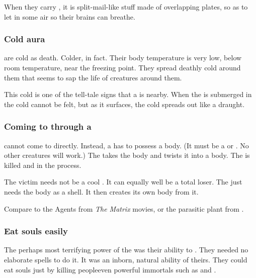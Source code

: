 When they carry \armour, it is split-mail-like stuff made of overlapping plates, so as to let in some air so their brains can breathe. 





\subsubsection{Cold aura}
\Banes{} are cold as death. Colder, in fact. Their body temperature is very low, below room temperature, near the freezing point. They spread deathly cold around them that seems to sap the life of creatures around them. 

This cold is one of the tell-tale signs that a \bane{} is nearby. When the \bane{} is submerged in \Nyx{} the cold cannot be felt, but as it surfaces, the cold spreads out like a draught. 





\subsubsection{Coming to \Miith through a \human}
\Banes{} cannot come to \Miith{} directly. 
Instead, a \bane{} has to possess a \human{} body. 
(It must be a \human{} or \resphan. No other creatures will work.) 
The \bane{} takes the body and twists it into a \bane{} body. 
The \human{} is killed and  in the process. 

The victim needs not be a cool \human. 
It can equally well be a total loser. 
The \bane{} just needs the body as a shell. 
It then creates its own \bane{} body from it. 

Compare to the Agents from \emph{The Matrix} movies, or the parasitic plant from . 





\subsubsection{Eat souls easily}
The perhaps most terrifying power of the \banes was their ability to . 
They needed no elaborate spells to do it. 
It was an inborn, natural ability of theirs. 
They could eat souls just by killing people\dash even powerful immortals such as \dragons and \resphain. 


